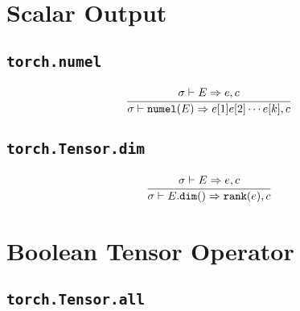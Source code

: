 \documentclass{article}
\begin{document}
\nointerlineskip
\par\noindent
\setlength{\parindent}{0pt}


\section*{Scalar Output}
\subsection*{\texttt{torch.numel}}
\begin{align*}
  \frac
  {
    \begin{array}{l}
      \sigma \vdash E \Rightarrow e, c
    \end{array}
  }
  {
    \sigma \vdash \mathtt{numel(}E\mathtt{)} \Rightarrow e[1] e[2] \cdots e[k], c
  }
\end{align*}

\subsection*{\texttt{torch.Tensor.dim}}
\begin{align*}
  \frac
  {
    \begin{array}{l}
      \sigma \vdash E \Rightarrow e, c
    \end{array}
  }
  {
    \sigma \vdash E.\mathtt{dim(}\mathtt{)} \Rightarrow \mathtt{rank(}e\mathtt{)}, c
  }
\end{align*}


\section*{Boolean Tensor Operator}
\subsection*{\texttt{torch.Tensor.all}}
\end{document}
